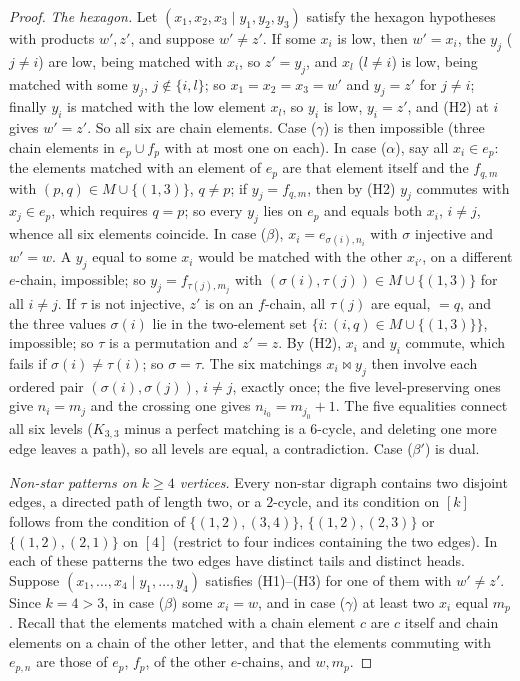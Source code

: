 \documentclass[11pt]{amsart}
\theoremstyle{definition}
\begin{document}
\begin{proof}
\emph{The hexagon.} Let $(x_1,x_2,x_3\mid y_1,y_2,y_3)$ satisfy the hexagon hypotheses with products $w',z'$, and suppose $w'\ne z'$. If some $x_i$ is low, then $w'=x_i$, the $y_j$ ($j\ne i$) are low, being matched with $x_i$, so $z'=y_j$, and $x_l$ ($l\ne i$) is low, being matched with some $y_j$, $j\notin\{i,l\}$; so $x_1=x_2=x_3=w'$ and $y_j=z'$ for $j\ne i$; finally $y_i$ is matched with the low element $x_l$, so $y_i$ is low, $y_i=z'$, and (H2) at $i$ gives $w'=z'$. So all six are chain elements. Case ($\gamma$) is then impossible (three chain elements in $e_p\cup f_p$ with at most one on each). In case ($\alpha$), say all $x_i\in e_p$: the elements matched with an element of $e_p$ are that element itself and the $f_{q,m}$ with $(p,q)\in M\cup\{(1,3)\}$, $q\ne p$; if $y_j=f_{q,m}$, then by (H2) $y_j$ commutes with $x_j\in e_p$, which requires $q=p$; so every $y_j$ lies on $e_p$ and equals both $x_i$, $i\ne j$, whence all six elements coincide. In case ($\beta$), $x_i=e_{\sigma(i),n_i}$ with $\sigma$ injective and $w'=w$. A $y_j$ equal to some $x_i$ would be matched with the other $x_{i'}$, on a different $e$-chain, impossible; so $y_j=f_{\tau(j),m_j}$ with $(\sigma(i),\tau(j))\in M\cup\{(1,3)\}$ for all $i\ne j$. If $\tau$ is not injective, $z'$ is on an $f$-chain, all $\tau(j)$ are equal, $=q$, and the three values $\sigma(i)$ lie in the two-element set $\{i:(i,q)\in M\cup\{(1,3)\}\}$, impossible; so $\tau$ is a permutation and $z'=z$. By (H2), $x_i$ and $y_i$ commute, which fails if $\sigma(i)\ne\tau(i)$; so $\sigma=\tau$. The six matchings $x_i\bowtie y_j$ then involve each ordered pair $(\sigma(i),\sigma(j))$, $i\ne j$, exactly once; the five level-preserving ones give $n_i=m_j$ and the crossing one gives $n_{i_0}=m_{j_0}+1$. The five equalities connect all six levels ($K_{3,3}$ minus a perfect matching is a $6$-cycle, and deleting one more edge leaves a path), so all levels are equal, a contradiction. Case ($\beta'$) is dual.

\emph{Non-star patterns on $k\ge4$ vertices.} Every non-star digraph contains two disjoint edges, a directed path of length two, or a $2$-cycle, and its condition on $[k]$ follows from the condition of $\{(1,2),(3,4)\}$, $\{(1,2),(2,3)\}$ or $\{(1,2),(2,1)\}$ on $[4]$ (restrict to four indices containing the two edges). In each of these patterns the two edges have distinct tails and distinct heads. Suppose $(x_1,\dots,x_4\mid y_1,\dots,y_4)$ satisfies (H1)--(H3) for one of them with $w'\ne z'$. Since $k=4>3$, in case ($\beta$) some $x_i=w$, and in case ($\gamma$) at least two $x_i$ equal $m_p$. Recall that the elements matched with a chain element $c$ are $c$ itself and chain elements on a chain of the other letter, and that the elements commuting with $e_{p,n}$ are those of $e_p$, $f_p$, of the other $e$-chains, and $w,m_p$.


\end{proof}
\end{document}
